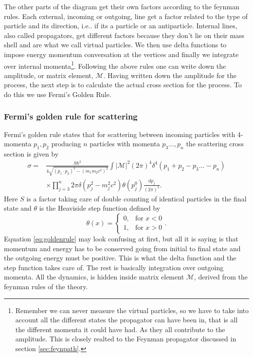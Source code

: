 The other parts of the diagram get their own factors according to the feynman rules. Each external, incoming or outgoing, line get a factor related to the type of particle and its direction, i.e.. if its a particle or an antiparticle. Internal lines, also called propagators, get different factors because they don't lie on their mass shell and are what we call virtual particles. We then use delta functions to impose energy momentum conversation at the vertices and finally we integrate over internal momenta\footnote{Remember we can never measure the virtual particles, so we have to take into account all the different states the propagator can have been in, that is all the different momenta it could have had. As they all contribute to the amplitude. This is closely realted to the Feynman propagator discussed in section \ref{sec:feynpath}.}. Following the above rules one can write down the amplitude, or matrix element, $\mathcal{M}$. Having written down the amplitude for the process, the next step is to calculate the actual cross section for the process. To do this we use Fermi's Golden Rule.
% 
\subsubsection{Fermi's golden rule for scattering}
Fermi's golden rule states that for scattering between incoming particles with 4-momenta $p_1, p_2$ producing $n$ particles with momenta $p_3 \dots , p_n$ the scattering cross section is given by\cite{griffiths1987iep}
\begin{align} \label{eq:goldenrule}
	\sigma = &\frac{S\hbar^2}{4\sqrt{(p_1 \cdot p_2)^2 - (m_1 m_2 c^2)^2}} \int |\mathcal{M}|^2 (2 \pi)^4 \delta^4(p_1+p_2-p_3 \dots -p_n) \nonumber \\
	&\times \prod_{j=3}^n 2\pi \delta(p_j^2 - m_j^2c^2)\theta(p_j^0) \frac{\textrm{d}p_j}{(2\pi)^2}.
\end{align}
Here $S$ is a factor taking care of double counting of identical particles in the final state and $\theta$ is the Heaviside step function defined by
\begin{equation}
	 \theta(x) = 
	\begin{cases} 
	  0,  & \mbox{for }x < 0 \\
	  1,  & \mbox{for }x > 0 
	\end{cases}.
\end{equation}
Equation \eqref{eq:goldenrule} may look confusing at first, but all it is saying is that momentum and energy has to be conserved going from initial to final state and the outgoing energy must be positive. This is what the delta function and the step function takes care of. The rest is basically integration over outgoing momenta. All the dynamics, is hidden inside matrix element $\mathcal{M}$, derived from the feynman rules of the theory.

